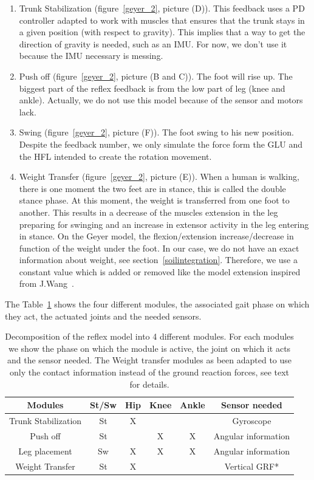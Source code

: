 \documentclass[a4paper,12pt]{article}
\begin{document}
\begin{enumerate}
	\item Trunk Stabilization (figure~\ref{geyer_2}, picture (D)). This feedback uses a PD controller adapted to work with muscles that ensures that the trunk stays in a given position (with respect to gravity). This implies that a way to get the direction of gravity is needed, such as an IMU. For now, we don't use it because the IMU necessary is messing.
    \item Push off  (figure~\ref{geyer_2}, picture (B and C)). The foot will rise up. The biggest part of the reflex feedback is from the low part of leg (knee and ankle). Actually, we do not use this model because of the sensor and motors lack.
    \item Swing  (figure~\ref{geyer_2}, picture (F)). The foot swing to his new position. Despite the feedback number, we only simulate the force form the GLU and the HFL intended to create the rotation movement.
    \item Weight Transfer (figure~\ref{geyer_2}, picture (E)). When a human is walking, there is one moment the two feet are in stance, this is called the double stance phase. At this moment, the weight is transferred from one foot to another. This results in a decrease of the muscles extension in the leg preparing for swinging and an increase in extensor activity in the leg entering in stance. On the Geyer model, the flexion/extension increase/decrease in function of the weight under the foot. In our case, we do not have an exact information about weight, see section~\ref{soilintegration}. Therefore, we use a constant value which is added or removed like the model extension inspired from J.Wang~\cite{wang2012opti}.
\end{enumerate}

The Table~\ref{modules} shows the four different modules, the associated gait phase on which they act, the actuated joints and the needed sensors.

\begin{table}
  \centering
  \begin{tabular}{c|c|c|c|c|c}
    Modules & St/Sw & Hip & Knee & Ankle & Sensor needed \\[0.01cm]
    \hline
    Trunk Stabilization  & St & X & & & Gyroscope \\
    Push off & St &  & X & X & Angular information \\
    Leg placement & Sw  & X & X & X & Angular information \\
    Weight Transfer & St & X & & & Vertical GRF*
    \label{modules}
  \end{tabular}
    \caption{Decomposition of the reflex model into 4 different modules. For each modules we show the phase on which the module is active, the joint on which it acts and the sensor needed. The Weight transfer modules as been adapted to use only the contact information instead of the ground reaction forces, see text for details.}
\end{table}
     
\end{document}
